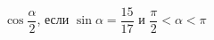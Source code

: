\begin{ex}[type=simplify_calculate]
	\begin{condition}
		\( \cos\dfrac{\alpha}{2} \), \quad если \( \sin\alpha=\dfrac{15}{17} \) и \( \dfrac{\pi}{2}<\alpha<\pi \)
	\end{condition}
\end{ex}